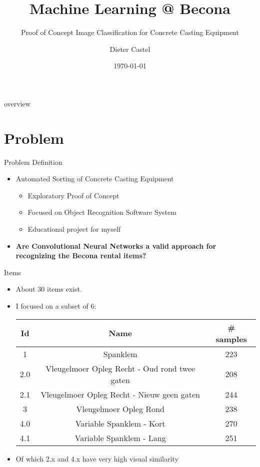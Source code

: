 \documentclass{beamer}
\title{Machine Learning @ Becona}
\subtitle{Proof of Concept Image Classification for Concrete Casting Equipment}
\author{Dieter Castel}
\date{\today}
\begin{document}
\begin{frame}
  \titlepage
\end{frame}

\begin{frame}{overview}
\tableofcontents
\end{frame}

\section{Problem}
\begin{frame}{Problem Definition}
  \begin{itemize}
	    \item Automated Sorting of Concrete Casting Equipment 
	    \begin{itemize}
	      \item Exploratory Proof of Concept 
	      \item Focused on Object Recognition Software System
	      \item Educational project for myself 
	    \end{itemize}
	    \item \textbf{Are Convolutional Neural Networks a valid approach for recognizing the Becona rental items?}
  \end{itemize}
\end{frame}

\begin{frame}{Items}
  \begin{itemize}
	    \item About 30 items exist.
	    \item I focused on a subset of 6: \\
	    \begin{tabular}{ccc}
	      Id & Name & \# samples \\ \hline
	      1 & Spanklem & 223 \\
	      2.0 & Vleugelmoer Opleg Recht - Oud rond twee gaten & 208 \\
	      2.1 & Vleugelmoer Opleg Recht - Nieuw geen gaten  & 244 \\
	      3 & Vleugelmoer Opleg Rond & 238 \\
	      4.0 & Variable Spanklem - Kort & 270 \\
	      4.1 & Variable Spanklem - Lang & 251  \\
	    \end{tabular}
	    \item Of which 2.x and 4.x have very high visual similarity
  \end{itemize}
\end{frame}
\end{document}

